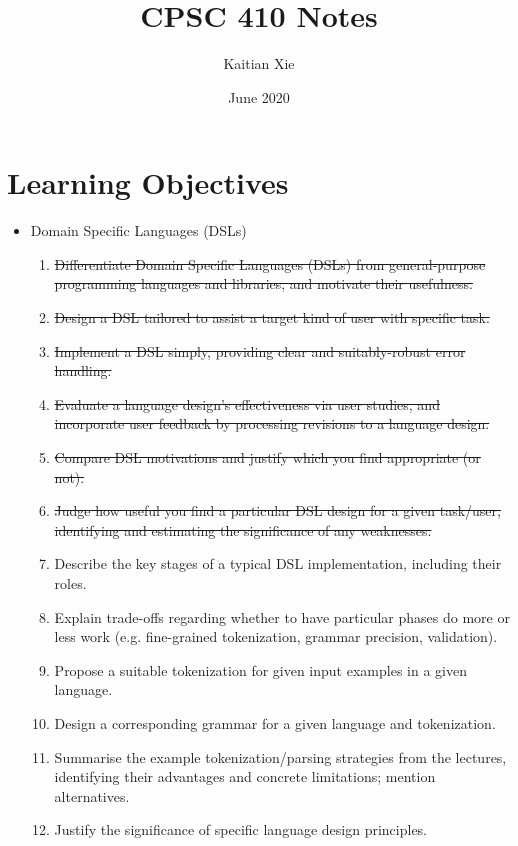 \documentclass{article}
\title{CPSC 410 Notes}
\author{Kaitian Xie}
\date{June 2020}
\begin{document}
\maketitle
\pagebreak

\tableofcontents
\pagebreak

\section{Learning Objectives}

\begin{itemize}
    \item Domain Specific Languages (DSLs)
    \begin{enumerate}
        \item \sout{Differentiate Domain Specific Languages (DSLs) from general-purpose programming languages and libraries, and motivate their usefulness.}
        \item \sout{Design a DSL tailored to assist a target kind of user with specific task.}
        \item \sout{Implement a DSL simply, providing clear and suitably-robust error handling.}
        \item \sout{Evaluate a language design's effectiveness via user studies, and incorporate user feedback by processing revisions to a language design.}
        \item \sout{Compare DSL motivations and justify which you find appropriate (or not).}
        \item \sout{Judge how useful you find a particular DSL design for a given task/user, identifying and estimating the significance of any weaknesses.}
        \item Describe the key stages of a typical DSL implementation, including their roles.
        \item Explain trade-offs regarding whether to have particular phases do more or less work (e.g. fine-grained tokenization, grammar precision, validation).
        \item Propose a suitable tokenization for given input examples in a given language.
        \item Design a corresponding grammar for a given language and tokenization.
        \item Summarise the example tokenization/parsing strategies from the lectures, identifying their advantages and concrete limitations; mention alternatives.
        \item Justify the significance of specific language design principles.

\end{enumerate}
\end{itemize}
\end{document}
